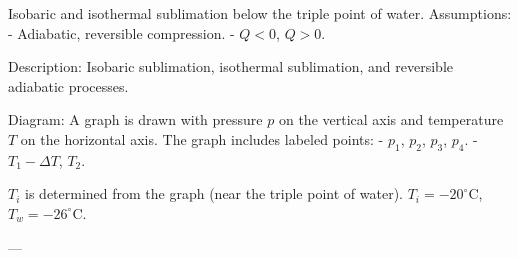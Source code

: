 Isobaric and isothermal sublimation below the triple point of water.  
Assumptions:  
- Adiabatic, reversible compression.  
- \( Q < 0 \), \( Q > 0 \).  

Description:  
Isobaric sublimation, isothermal sublimation, and reversible adiabatic processes.  

Diagram:  
A graph is drawn with pressure \( p \) on the vertical axis and temperature \( T \) on the horizontal axis.  
The graph includes labeled points:  
- \( p_1 \), \( p_2 \), \( p_3 \), \( p_4 \).  
- \( T_1 - \Delta T \), \( T_2 \).  

\( T_i \) is determined from the graph (near the triple point of water).  
\( T_i = -20^\circ \text{C} \), \( T_w = -26^\circ \text{C} \).  

---